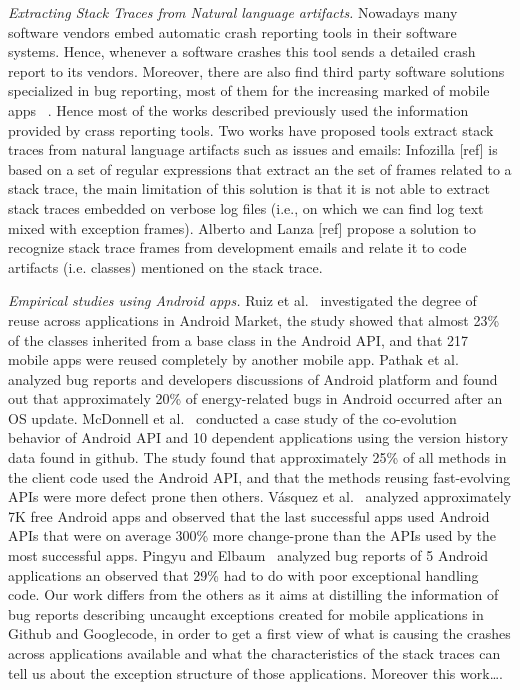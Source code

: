 \documentclass[conference]{IEEEtran}
\begin{document}
\textit{Extracting Stack Traces from Natural language artifacts.} Nowadays many software vendors embed automatic crash reporting tools in their software systems. Hence, whenever a software crashes this tool sends a detailed crash report to its vendors. Moreover, there are also find third party software solutions specialized in bug reporting, most of them for the increasing marked of mobile apps ~\cite{BugSe14,BugSn14,Googl14,Acra14}. Hence most of the works described previously used the  information provided by crass reporting tools. Two works have proposed tools extract stack traces from natural language artifacts such as issues and emails: Infozilla [ref] is based on a set of regular expressions that extract an the set of frames related to a stack trace, the main limitation of this solution is that it is not able to extract stack traces embedded on verbose log files (i.e., on which we can find log text mixed with exception frames). Alberto and Lanza [ref] propose a solution to recognize stack trace frames from development emails and relate it to code artifacts (i.e. classes) mentioned on the stack trace.    

\textit{Empirical studies using Android apps.} Ruiz et al.~\cite{Ruiz12} investigated the degree of reuse across applications in Android Market, the study showed that almost 23\% of the classes inherited
from a base class in the Android API, and that 217 mobile apps were reused
completely by another mobile app. Pathak et al.~\cite{Patha11} analyzed bug
reports and developers discussions of Android platform and found out that
approximately 20\% of energy-related bugs in Android occurred after an OS
update. McDonnell et al.~\cite{McDon13} conducted a case study of the
co-evolution behavior of Android API and 10 dependent applications using the
version history data found in github. The study found that approximately 25\% of
all methods in the client code used the Android API, and that the methods
reusing fast-evolving APIs were more defect prone then others. Vásquez et
al.~\cite{Linar13} analyzed approximately 7K free Android apps and observed that
the last successful apps used Android APIs that were on average 300\% more
change-prone than the APIs used by the most successful apps. Pingyu and
Elbaum~\cite{Zhang12} analyzed bug reports of 5 Android applications an observed
that 29\% had to do with poor exceptional handling code.  Our work differs from
the others as it aims at distilling the information of bug reports describing
uncaught exceptions created for mobile applications in Github and Googlecode, in
order to get a first view of what is causing the crashes across applications
available and what the characteristics of the stack traces can tell us about the
exception structure of those applications. Moreover this work\ldots.
\end{document}
